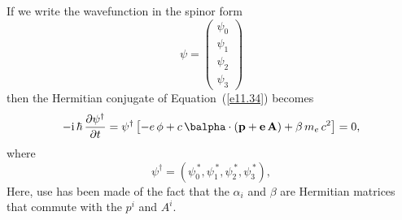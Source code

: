 If we write the wavefunction in the spinor form
\begin{equation}
\psi= \left(\begin{array}{c}\psi_0\\[0.5ex]\psi_1\\[0.5ex]\psi_2\\[0.5ex]\psi_3\end{array}\right)
\end{equation}
then the Hermitian conjugate of Equation~(\ref{e11.34}) becomes
\begin{equation}
-{\rm i}\,\hbar\,\frac{\partial\psi^\dag}{\partial t} =\psi^\dag\left[-e\,\phi + c\,\balpha\cdot({\bf p} +{\bf e}\,{\bf A})+ \beta\,m_e\,c^2\right] = 0,
\end{equation}
where
\begin{equation}
\psi^\dag = \left(\psi_0^{\,\ast}, \psi_1^{\,\ast},\psi_2^{\,\ast},\psi_3^{\,\ast}\right),
\end{equation}
Here, use has been made of the fact that the $\alpha_i$ and $\beta$ are Hermitian matrices that commute with the $p^i$ and $A^i$. 

